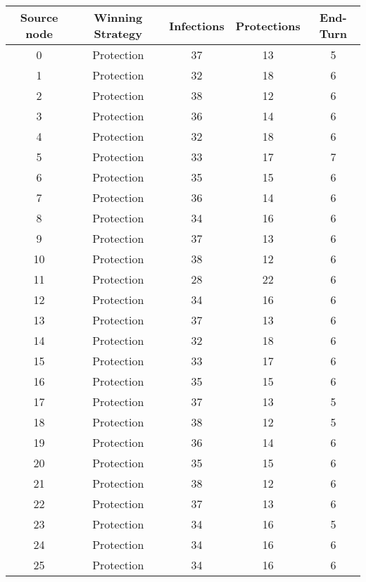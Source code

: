 \documentclass[results.tex]{subfiles}
\begin{document}
\begin{center}
  \begin{tabular}{| c || c | c | c | c |}
    \hline
    {\bfseries Source node} & {\bfseries Winning Strategy} & {\bfseries Infections} & {\bfseries Protections} & {\bfseries End-Turn} \\  %
    \hline\hline
    0 & Protection & 37 & 13 & 5 \\ 
    \hline
    1 & Protection & 32 & 18 & 6 \\ 
    \hline
    2 & Protection & 38 & 12 & 6 \\ 
    \hline
    3 & Protection & 36 & 14 & 6 \\ 
    \hline
    4 & Protection & 32 & 18 & 6 \\ 
    \hline
    5 & Protection & 33 & 17 & 7 \\ 
    \hline
    6 & Protection & 35 & 15 & 6 \\ 
    \hline
    7 & Protection & 36 & 14 & 6 \\ 
    \hline
    8 & Protection & 34 & 16 & 6 \\ 
    \hline
    9 & Protection & 37 & 13 & 6 \\ 
    \hline
    10 & Protection & 38 & 12 & 6 \\ 
    \hline
    11 & Protection & 28 & 22 & 6 \\ 
    \hline
    12 & Protection & 34 & 16 & 6 \\ 
    \hline
    13 & Protection & 37 & 13 & 6 \\ 
    \hline
    14 & Protection & 32 & 18 & 6 \\ 
    \hline
    15 & Protection & 33 & 17 & 6 \\ 
    \hline
    16 & Protection & 35 & 15 & 6 \\ 
    \hline
    17 & Protection & 37 & 13 & 5 \\ 
    \hline
    18 & Protection & 38 & 12 & 5 \\ 
    \hline
    19 & Protection & 36 & 14 & 6 \\ 
    \hline
    20 & Protection & 35 & 15 & 6 \\ 
    \hline
    21 & Protection & 38 & 12 & 6 \\ 
    \hline
    22 & Protection & 37 & 13 & 6 \\ 
    \hline
    23 & Protection & 34 & 16 & 5 \\ 
    \hline
    24 & Protection & 34 & 16 & 6 \\ 
    \hline
    25 & Protection & 34 & 16 & 6 \\ 

\end{tabular}
\end{center}
\end{document}
